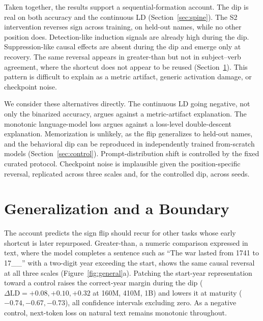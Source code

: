 \documentclass[11pt]{article}
\begin{document}
Taken together, the results support a sequential-formation account. The dip is
real on both accuracy and the continuous LD (Section~\ref{sec:spine}). The S2
intervention reverses sign across training, on held-out names, while no other
position does. Detection-like induction signals are already high during the dip.
Suppression-like causal effects are absent during the dip and emerge only at
recovery. The same reversal appears in greater-than but not in subject--verb
agreement, where the shortcut does not appear to be reused
(Section~\ref{sec:general}). This pattern is difficult to explain as a metric
artifact, generic activation damage, or checkpoint noise.

We consider these alternatives directly. The continuous LD going negative, not
only the binarized accuracy, argues against a metric-artifact explanation. The
monotonic language-model loss argues against a loss-level double-descent
explanation. Memorization is unlikely, as the flip generalizes to held-out names,
and the behavioral dip can be reproduced in independently trained from-scratch
models (Section~\ref{sec:control}). Prompt-distribution shift is controlled by
the fixed curated protocol. Checkpoint noise is implausible given the
position-specific reversal, replicated across three scales and, for the
controlled dip, across seeds.

\section{Generalization and a Boundary}
\label{sec:general}
The account predicts the sign flip should recur for other tasks whose early
shortcut is later repurposed. Greater-than, a numeric comparison expressed in
text, where the model completes a sentence such as ``The war lasted from 1741 to
17{\_}{\_}'' with a two-digit year exceeding the start, shows the same causal
reversal at all three scales (Figure~\ref{fig:general}a). Patching the start-year
representation toward a
control raises the correct-year margin during the dip ($\Delta\mathrm{LD}=+0.08,
+0.10, +0.32$ at 160M, 410M, 1B) and lowers it at maturity ($-0.74, -0.67,
-0.73$), all confidence intervals excluding zero. As a negative control,
next-token loss on natural text remains monotonic throughout.
\end{document}
